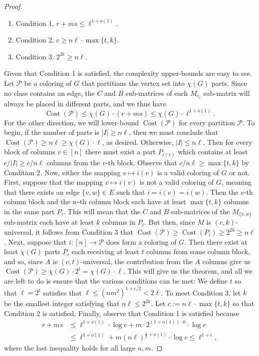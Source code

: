 \begin{proof}
\begin{enumerate}
\item Condition 1. $r+ms\le\ell^{1+o(1)}$.
\item Condition 2. $c\ge n\ell\cdot\max\{t,k\}$.
\item Condition 3. $2^{2k}\ge n\ell$.
\end{enumerate}
Given that Condition 1 is satisfied, the complexity upper-bounds are easy to see. Let $\mathcal P$ be a coloring of $G$ that partitions the vertex set into $\chi(G)$ parts. Since no class contains an edge, the $C$ and $B$ sub-matrices of each $M_{e_i}$ sub-matrix will always be placed in different parts, and we thus have
\[\operatorname{Cost}(\mathcal P)\le\chi(G)\cdot(r+ms)\le\chi(G)\cdot\ell^{1+o(1)}.\]
For the other direction, we will lower-bound $\operatorname{Cost}(\mathcal P)$ for every partition $\mathcal P$. To begin, if the number of parts is $|I|\ge n\ell$, then we must conclude that $\operatorname{Cost}(\mathcal P)\ge n\ell\ge\chi(G)\cdot\ell$, as desired.
Otherwise, $|I|\le n\ell$. Then for every block of columns $v\in[n]$ there must exist a part $P_{i(v)}$ which contains at least $c/|I|\ge c/n\ell$ columns from the $v$-th block. Observe that $c/n\ell\ge\max\{t,k\}$ by Condition 2.
Now, either the mapping $v\mapsto i(v)$ is a valid coloring of $G$ or not. First, suppose that the mapping $v\mapsto i(v)$ is not a valid coloring of $G$, meaning that there exists an edge $\{v,w\}\in E$ such that $i=i(v)=i(w)$. Then the $v$-th column block and the $w$-th column block each have at least $\max\{t,k\}$ columns in the same part $P_i$. This will mean that the $C$ and $B$ sub-matrices of the $M_{\{v,w\}}$ sub-matrix each have at least $k$ columns in $P_i$. But then, since $M$ is $(c,k)$-universal, it follows from Condition 3 that $\operatorname{Cost}(\mathcal P)\ge\operatorname{Cost}(P_i)\ge2^{2k}\ge n\ell$.
Next, suppose that $i:[n]\to\mathcal P$ does form a coloring of $G$. Then there exist at least $\chi(G)$ parts $P_i$ each receiving at least $t$ columns from some column block, and so, since $A$ is $(c,t)$-universal, the contribution from the $A$ columns give us $\operatorname{Cost}(\mathcal P)\ge\chi(G)\cdot2^t=\chi(G)\cdot\ell$.
This will give us the theorem, and all we are left to do is ensure that the various conditions can be met: We define $t$ so that $\ell=2^t$ satisfies that $\ell\le(nm^2)^{1+\epsilon/2}<2\ell$. To meet Condition 3, let $k$ be the smallest integer satisfying that $n\ell\le2^{2k}$. Let $c:=n\ell\cdot\max\{t,k\}$ so that Condition 2 is satisfied. Finally, observe that Condition 1 is satisfied because
\begin{align*}
r+ms&\le\ell^{1+o(1)}\cdot\log c+m\cdot2^{(1+o(1))\cdot k}\cdot\log c\\
&\le\ell^{1+o(1)}+m(n\ell)^{\frac12+o(1)}\cdot\log c\le\ell^{1+\epsilon},
\end{align*}
where the last inequality holds for all large $n,m$.
\end{proof}

